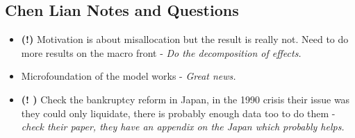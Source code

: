 \documentclass[12pt]{article}
\begin{document}
\subsection*{Chen Lian Notes and Questions}
\begin{itemize} \setlength\itemsep{0em}  \small
    \item \textbf{(!)} Motivation is about misallocation but the result is really not. Need to do more results on the macro front - \textit{Do the decomposition of effects.}
    \item Microfoundation of the model works - \textit{Great news.}
    \item \textbf{(! \checkmark)} Check the bankruptcy reform in Japan, in the 1990 crisis their issue was they could only liquidate, there is probably enough data too to do them - \textit{check their paper, they have an appendix on the Japan which probably helps.}
\end{itemize} \normalsize
\end{document}
